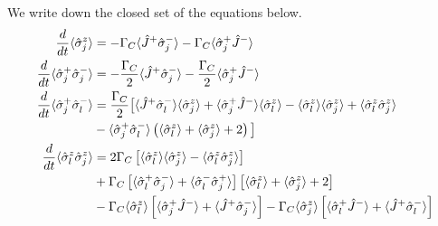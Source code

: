 \documentclass{article}
\newcommand{\gc}{\Gamma_C}
\begin{document}
We write down the closed set of the equations below.
\begin{align}
\label{de1}
\frac{d}{dt}\langle\hat{\sigma}^z_j\rangle&=-\gc\langle\hat{J}^+\hat{\sigma}^-_j\rangle-\gc\langle\hat{\sigma}_j^+\hat{J}^-\rangle\\
\label{de2}
\frac{d}{dt}\langle\hat{\sigma}^+_j\hat{\sigma}^-_j\rangle&=-\frac{\gc}{2}\langle\hat{J}^+\hat{\sigma}^-_j\rangle-\frac{\gc}{2}\langle\hat{\sigma}_j^+\hat{J}^-\rangle\\\notag
\frac{d}{dt}\langle\hat{\sigma}^+_j\hat{\sigma}^-_l\rangle&=\frac{\gc}{2}\big[\langle\hat{J}^+\hat{\sigma}_l^-\rangle \langle \hat{\sigma}_j^z\rangle+\langle\hat{\sigma}^+_j\hat{J}^-\rangle \langle \hat{\sigma}_l^z\rangle-\langle\hat{\sigma}_l^z\rangle \langle \hat{\sigma}_j^z\rangle+\langle\hat{\sigma}_l^z \hat{\sigma}_j^z\rangle\\
\label{de3}
&-\langle\hat{\sigma}_j^+ \hat{\sigma}_l^-\rangle\left(\langle\hat{\sigma}_l^z\rangle +\langle \hat{\sigma}_j^z\rangle+2\right)\big]\\\notag
\frac{d}{dt}\langle\hat{\sigma}_l^z \hat{\sigma}_j^z\rangle&=2\gc\left[\langle\hat{\sigma}_l^z\rangle \langle \hat{\sigma}_j^z\rangle-\langle\hat{\sigma}_l^z \hat{\sigma}_j^z\rangle\right]\\\notag
&+\gc\left[\langle\hat{\sigma}_l^+\hat{\sigma}_j^-\rangle+\langle\hat{\sigma}_l^-\hat{\sigma}_j^+\rangle\right]\left[\langle\hat{\sigma}_l^z\rangle+\langle \hat{\sigma}_j^z\rangle+2\right]\\
\label{de4}
&-\gc\langle\hat{\sigma}_l^z\rangle\left[\langle\hat{\sigma}_j^+\hat{J}^-\rangle+\langle\hat{J}^+\hat{\sigma}_j^-\rangle\right]-\gc\langle\hat{\sigma}_j^z\rangle\left[\langle\hat{\sigma}_l^+\hat{J}^-\rangle+\langle\hat{J}^+\hat{\sigma}_l^-\rangle\right]
\end{align}

\end{document}
